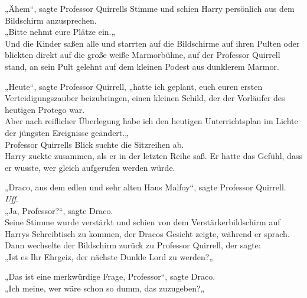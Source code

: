 {„Ähem“, sagte Professor Quirrells Stimme und schien Harry persönlich aus dem Bildschirm anzusprechen.\\ „Bitte nehmt eure Plätze ein.„\\ Und die Kinder saßen alle und starrten auf die Bildschirme auf ihren Pulten oder blickten direkt auf die große weiße Marmorbühne, auf der Professor Quirrell stand, an sein Pult gelehnt auf dem kleinen Podest aus dunklerem Marmor.

„Heute“, sagte Professor Quirrell, „hatte ich geplant, euch euren ersten Verteidigungszauber beizubringen, einen kleinen Schild, der der Vorläufer des heutigen Protego war.\\ Aber nach reiflicher Überlegung habe ich den heutigen Unterrichtsplan im Lichte der jüngsten Ereignisse geändert.„\\ Professor Quirrells Blick suchte die Sitzreihen ab.\\ Harry zuckte zusammen, als er in der letzten Reihe saß. Er hatte das Gefühl, dass er wusste, wer gleich aufgerufen werden würde.

„Draco, aus dem edlen und sehr alten Haus Malfoy“, sagte Professor Quirrell.\\ \emph{Uff}.\\ „Ja, Professor?“, sagte Draco.\\ Seine Stimme wurde verstärkt und schien von dem Verstärkerbildschirm auf Harrys Schreibtisch zu kommen, der Dracos Gesicht zeigte, während er sprach. Dann wechselte der Bildschirm zurück zu Professor Quirrell, der sagte:\\ „Ist es Ihr Ehrgeiz, der nächste Dunkle Lord zu werden?„

„Das ist eine merkwürdige Frage, Professor“, sagte Draco.\\ „Ich meine, wer wäre schon so dumm, das zuzugeben?„

}
